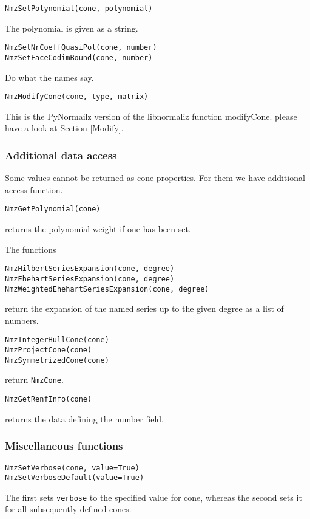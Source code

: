 \documentclass[12pt,a4paper]{scrartcl}
\theoremstyle{definition}
\begin{document}
\begin{small}
\begin{Verbatim}
NmzSetPolynomial(cone, polynomial)
\end{Verbatim}
The polynomial is given as a string.

\begin{Verbatim}
NmzSetNrCoeffQuasiPol(cone, number)
NmzSetFaceCodimBound(cone, number)
\end{Verbatim}
Do what the names say.

\begin{Verbatim}
NmzModifyCone(cone, type, matrix)
\end{Verbatim}
This is the PyNormailz version of the libnormaliz function modifyCone. please have a look at Section \ref{Modify}.

\subsubsection{Additional data access}

Some values cannot be returned as cone properties. For them we have additional access function.

\begin{Verbatim}
NmzGetPolynomial(cone)
\end{Verbatim}
returns the polynomial weight if one has been set.

The functions
\begin{Verbatim}
NmzHilbertSeriesExpansion(cone, degree)
NmzEhehartSeriesExpansion(cone, degree)
NmzWeightedEhehartSeriesExpansion(cone, degree)
\end{Verbatim}
return the expansion of the named series up to the given degree as a list of numbers. 

\begin{Verbatim}
NmzIntegerHullCone(cone)
NmzProjectCone(cone)
NmzSymmetrizedCone(cone)
\end{Verbatim}
return \verb|NmzCone|.

\begin{Verbatim}
NmzGetRenfInfo(cone)
\end{Verbatim}
returns the data defining the number field.

\subsubsection{Miscellaneous functions}

\begin{Verbatim}
NmzSetVerbose(cone, value=True)
NmzSetVerboseDefault(value=True)
\end{Verbatim}
The first sets \verb|verbose| to the specified value for cone, whereas the second sets it for all subsequently defined cones.


\end{small}
\end{document}
